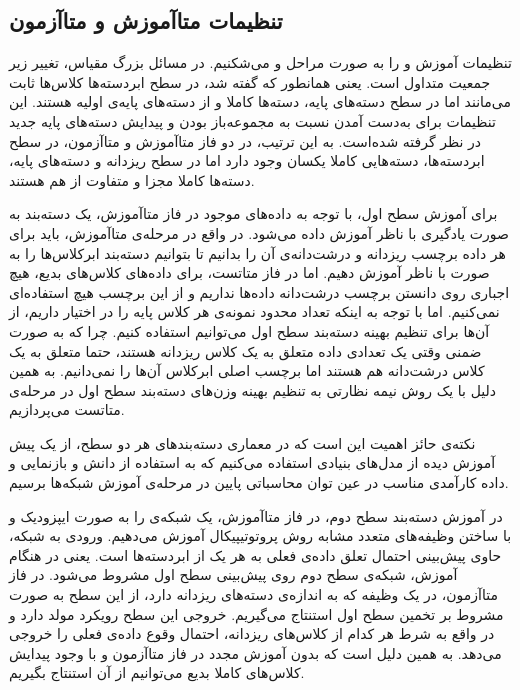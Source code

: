  \subsection{تنظیمات متاآموزش و متاآزمون}\label{sec:settingDef}
 
 تنظیمات آموزش و
  را به صورت مراحل 
 و 
 می‌شکنیم. در مسائل بزرگ مقیاس، تغییر زیر جمعیت متداول است. یعنی همانطور که گفته شد، در سطح ابردسته‌ها کلاس‌ها ثابت می‌مانند اما در سطح دسته‌های پایه، دسته‌ها کاملا
  و 
   از دسته‌های پایه‌ی اولیه هستند. این تنظیمات برای به‌دست آمدن 
 نسبت به مجموعه‌باز بودن و پیدایش دسته‌های پایه جدید در نظر گرفته شده‌است. به این ترتیب، در دو فاز متاآموزش و متاآزمون، در سطح ابردسته‌ها، دسته‌هایی کاملا یکسان وجود دارد اما در سطح ریزدانه و دسته‌های پایه، دسته‌ها کاملا مجزا و متفاوت از هم هستند.
 
 برای آموزش سطح اول، با توجه به داده‌های موجود در فاز متاآموزش، یک دسته‌بند به صورت یادگیری با ناظر آموزش داده می‌شود. در واقع در مرحله‌ی متاآموزش، باید برای هر داده برچسب ریزدانه و درشت‌دانه‌ی آن را بدانیم تا بتوانیم دسته‌بند ابرکلاس‌ها را به صورت با ناظر آموزش دهیم. اما در فاز متاتست، برای داده‌های کلاس‌های بدیع، هیچ اجباری روی دانستن برچسب درشت‌دانه داده‌ها نداریم و از این برچسب هیچ استفاده‌ای نمی‌کنیم. اما با توجه به اینکه تعداد محدود نمونه‌ی 
 هر کلاس پایه را در اختیار داریم، از آن‌ها برای تنظیم بهینه دسته‌بند سطح اول می‌توانیم استفاده کنیم. چرا که به صورت ضمنی وقتی یک تعدادی داده متعلق به یک کلاس ریزدانه هستند، حتما متعلق به یک کلاس درشت‌دانه هم هستند اما برچسب اصلی ابرکلاس آن‌ها را نمی‌دانیم. به همین دلیل با یک روش نیمه نظارتی به تنظیم بهینه وزن‌های دسته‌بند سطح اول در مرحله‌ی متاتست می‌پردازیم.
 
  نکته‌ی حائز اهمیت این است که در معماری دسته‌بند‌های هر دو سطح، از یک 
 پیش آموزش دیده از مدل‌های بنیادی استفاده می‌کنیم که به استفاده از دانش و بازنمایی 
 و داده کارآمدی مناسب در عین توان محاسباتی پایین در مرحله‌ی آموزش شبکه‌ها برسیم.
 
 در آموزش دسته‌بند سطح دوم، در فاز متاآموزش، یک شبکه‌ی 
 را به صورت ایپزودیک و با ساختن وظیفه‌های متعدد مشابه روش پروتوتیپیکال آموزش می‌دهیم. ورودی به شبکه، حاوی پیش‌بینی احتمال تعلق داده‌ی فعلی به هر یک از ابردسته‌ها است. یعنی در هنگام آموزش، شبکه‌ی سطح دوم روی پیش‌بینی سطح اول مشروط می‌شود. در فاز متاآزمون، در یک وظیفه که به اندازه‌ی دسته‌های ریزدانه 
 دارد، از این سطح به صورت مشروط بر تخمین سطح اول استنتاج می‌گیریم. خروجی این سطح رویکرد مولد دارد و در واقع به شرط هر کدام از کلاس‌های ریزدانه، احتمال وقوع داده‌ی فعلی را خروجی می‌دهد. به همین دلیل است که بدون آموزش مجدد در فاز متاآزمون و با وجود پیدایش کلاس‌های کاملا بدیع می‌توانیم از آن استنتاج بگیریم.
 
